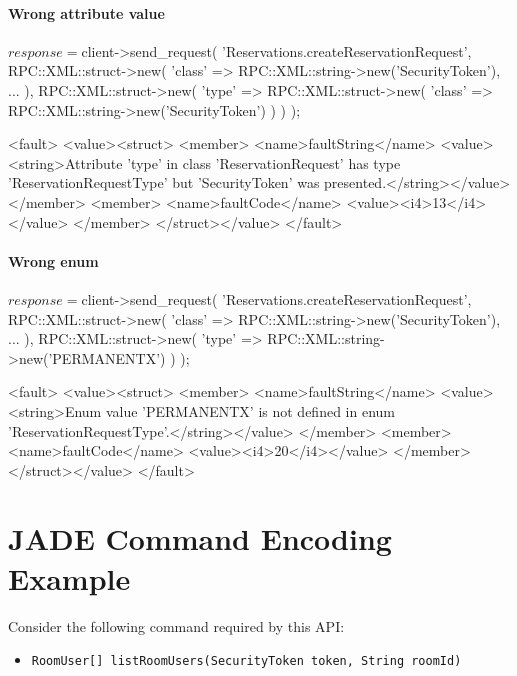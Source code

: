 \documentclass[a4paper]{report}
\newenvironment{Api}{\begin{itemize}}{\end{itemize}}
\newcommand{\ApiCode}[1]{\lstinline[style=styleApi]|#1|}
\newcommand{\ApiItem}[1]{\item #1 %

}
\newcommand{\ApiCmd}[1]{\ApiItem{\ApiCode{#1}}}
\begin{document}
\subsubsection{Wrong attribute value}
\begin{PerlCmd}
$response = $client->send_request(
    'Reservations.createReservationRequest',
    RPC::XML::struct->new(
        'class' => RPC::XML::string->new('SecurityToken'),
        ...
    ),
    RPC::XML::struct->new(
        'type' => RPC::XML::struct->new(
            'class' => RPC::XML::string->new('SecurityToken')
        )
    )
);
\end{PerlCmd}
\begin{PerlResponse}
<fault>
  <value><struct>
    <member>
      <name>faultString</name>
      <value><string>Attribute 'type' in class 'ReservationRequest' has type
          'ReservationRequestType' but 'SecurityToken' was presented.</string></value>
    </member>
    <member>
      <name>faultCode</name>
      <value><i4>13</i4></value>
    </member>
  </struct></value>
</fault>
\end{PerlResponse}

\subsubsection{Wrong enum}
\begin{PerlCmd}
$response = $client->send_request(
    'Reservations.createReservationRequest',
    RPC::XML::struct->new(
        'class' => RPC::XML::string->new('SecurityToken'),
        ...
    ),
    RPC::XML::struct->new(
        'type' => RPC::XML::string->new('PERMANENTX')
    )
);
\end{PerlCmd}
\begin{PerlResponse}
<fault>
  <value><struct>
    <member>
      <name>faultString</name>
      <value><string>Enum value 'PERMANENTX' is not defined in enum
          'ReservationRequestType'.</string></value>
    </member>
    <member>
      <name>faultCode</name>
      <value><i4>20</i4></value>
    </member>
  </struct></value>
</fault>
\end{PerlResponse}

\chapter{JADE Command Encoding Example} \label{appendix:jade-command-encoding}

Consider the following command required by this API:
\begin{Api}
\ApiCmd{RoomUser[] listRoomUsers(SecurityToken token, String roomId)}
\end{Api}
\end{document}
